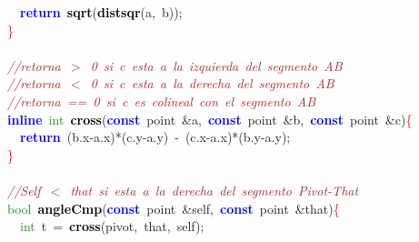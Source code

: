 {{\mbox{}\ \ \textbf{\textcolor{Blue}{return}}\ \textbf{\textcolor{Black}{sqrt}}\textcolor{BrickRed}{(}\textbf{\textcolor{Black}{distsqr}}\textcolor{BrickRed}{(}a\textcolor{BrickRed}{,}\ b\textcolor{BrickRed}{));} \\
\mbox{}\textcolor{Red}{\}} \\
\mbox{} \\
\mbox{}\textit{\textcolor{Brown}{//retorna\ $>$\ 0\ si\ c\ esta\ a\ la\ izquierda\ del\ segmento\ AB}} \\
\mbox{}\textit{\textcolor{Brown}{//retorna\ $<$\ 0\ si\ c\ esta\ a\ la\ derecha\ del\ segmento\ AB}} \\
\mbox{}\textit{\textcolor{Brown}{//retorna\ ==\ 0\ si\ c\ es\ colineal\ con\ el\ segmento\ AB}} \\
\mbox{}\textbf{\textcolor{Blue}{inline}}\ \textcolor{ForestGreen}{int}\ \textbf{\textcolor{Black}{cross}}\textcolor{BrickRed}{(}\textbf{\textcolor{Blue}{const}}\ point\ \textcolor{BrickRed}{\&}a\textcolor{BrickRed}{,}\ \textbf{\textcolor{Blue}{const}}\ point\ \textcolor{BrickRed}{\&}b\textcolor{BrickRed}{,}\ \textbf{\textcolor{Blue}{const}}\ point\ \textcolor{BrickRed}{\&}c\textcolor{BrickRed}{)}\textcolor{Red}{\{} \\
\mbox{}\ \ \textbf{\textcolor{Blue}{return}}\ \textcolor{BrickRed}{(}b\textcolor{BrickRed}{.}x\textcolor{BrickRed}{-}a\textcolor{BrickRed}{.}x\textcolor{BrickRed}{)*(}c\textcolor{BrickRed}{.}y\textcolor{BrickRed}{-}a\textcolor{BrickRed}{.}y\textcolor{BrickRed}{)}\ \textcolor{BrickRed}{-}\ \textcolor{BrickRed}{(}c\textcolor{BrickRed}{.}x\textcolor{BrickRed}{-}a\textcolor{BrickRed}{.}x\textcolor{BrickRed}{)*(}b\textcolor{BrickRed}{.}y\textcolor{BrickRed}{-}a\textcolor{BrickRed}{.}y\textcolor{BrickRed}{);} \\
\mbox{}\textcolor{Red}{\}} \\
\mbox{} \\
\mbox{}\textit{\textcolor{Brown}{//Self\ $<$\ that\ si\ esta\ a\ la\ derecha\ del\ segmento\ Pivot-That}} \\
\mbox{}\textcolor{ForestGreen}{bool}\ \textbf{\textcolor{Black}{angleCmp}}\textcolor{BrickRed}{(}\textbf{\textcolor{Blue}{const}}\ point\ \textcolor{BrickRed}{\&}self\textcolor{BrickRed}{,}\ \textbf{\textcolor{Blue}{const}}\ point\ \textcolor{BrickRed}{\&}that\textcolor{BrickRed}{)}\textcolor{Red}{\{} \\
\mbox{}\ \ \textcolor{ForestGreen}{int}\ t\ \textcolor{BrickRed}{=}\ \textbf{\textcolor{Black}{cross}}\textcolor{BrickRed}{(}pivot\textcolor{BrickRed}{,}\ that\textcolor{BrickRed}{,}\ self\textcolor{BrickRed}{);} \\
}}
